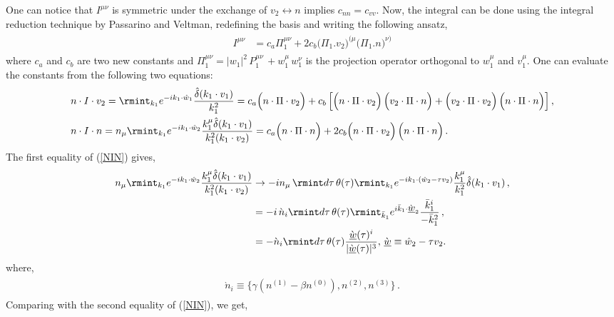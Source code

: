 One can notice that $I^{\mu\nu}$ is symmetric under the exchange of $v_2 \leftrightarrow n$ implies $c_{nn}=c_{vv}$. Now, the integral can be done using the integral reduction technique by Passarino and Veltman, redefining the basis and writing the following ansatz, 
\begin{align}
        \begin{split}
\label{Ansatz2}I^{\mu\nu}&=c_{a}\Pi_{1}^{\mu\nu}+ 2c_{b}\Big(\Pi_{1}.v_{2}\Big)^{(\mu}\Big(\Pi_{1}.n\Big)^{\nu)}
\end{split}
    \end{align}
where $c_{a}$ and $c_{b}$ are two new constants and $\Pi_{1}^{\mu\nu}= |w_{1}|^{2}\,P_{1}^{\mu\nu}\,+ w_{1}^{\mu}\,w_{1}^{\nu}$ is the projection operator orthogonal to $w_{1}^{\mu}$ and $v_{1}^{\mu}$. One can evaluate the constants from the following two equations:
\begin{align}
\label{NV2}  &  n\cdot I\cdot v_2=\rmint_{k_1}e^{-ik_1\cdot \hat w_1}\frac{\hat\delta(k_1\cdot v_1)}{k_1^2}= c_{a}\Big(n\cdot \Pi\cdot v_{2}\Big)+ c_{b}\,\Big[\Big(n\cdot \Pi\cdot v_{2}\Big)\,\Big(v_{2}\cdot \Pi\cdot n\Big)+ \Big(v_{2}\cdot \Pi\cdot v_{2}\Big)\,\Big(n\cdot \Pi\cdot n\Big)\Big]\,,\\ &
\label{NIN}  n\cdot I \cdot n= n_\mu \rmint_{k_1}e^{-ik_1\cdot \hat w_2}\frac{k_1^\mu\hat\delta(k_1\cdot v_1)}{k_1^2 (k_1\cdot v_2)}= c_{a}\Big(n\cdot \Pi\cdot n\Big)+ 2c_{b}\Big(n\cdot \Pi\cdot v_{2}\Big)\,\Big(n\cdot \Pi\cdot n\Big)\,.
\end{align}
The first equality of (\ref{NIN}) gives,
\begin{align}
\begin{split}
   n_\mu \rmint_{k_1}e^{-ik_1\cdot \hat w_2}\frac{k_1^\mu\hat\delta(k_1\cdot v_1)}{k_1^2 (k_1\cdot v_2)}&\to -i n_\mu\, \rmint d\tau\,\theta(\tau)\rmint_{ k_1} e^{-i k_1\cdot (\hat{w}_2-\tau v_2)}\frac{{k}_1^\mu}{k_1^2}\hat\delta(k_1\cdot v_1)\,,\\ &
   =-i\, \grave{n}_i\rmint d\tau\,\theta(\tau)
   \rmint_{\bar k_1}e^{i \bar k_1\cdot \grave{\underbar{$w$}}_2}\frac{\bar k_1^i}{-\bar k_1^2}\,,\\ &
   =-\grave n_i\rmint d\tau \,\theta(\tau)\frac{\grave{\underbar{$w$}}(\tau)^i}{|\grave{\underbar{$w$}}(\tau)|^3},\,\grave{\underbar{$w$}}\equiv \hat{w}_2-\tau v_2.
   \end{split}
\end{align}
where,
\begin{align}
    \begin{split}
        \grave n_i\equiv \Big\{\gamma(n^{(1)}-\beta n^{(0)}),n^{(2)},n^{(3)}\Big\}\,.
    \end{split}
\end{align}
Comparing with the second equality of (\ref{NIN}), we get,

